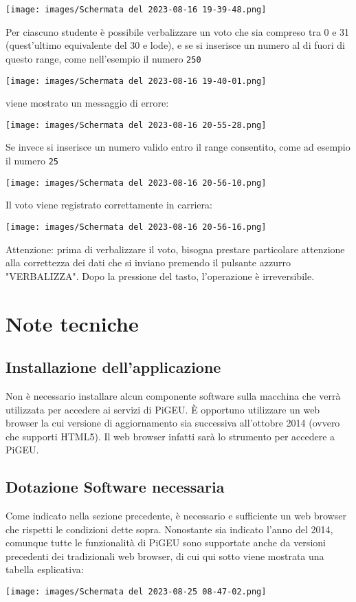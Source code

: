 \documentclass{article}
\begin{document}
    \texttt{[image: images/Schermata del 2023-08-16 19-39-48.png]}

    Per ciascuno studente è possibile verbalizzare un voto che sia compreso tra 0 e 31 (quest'ultimo equivalente del 30 e lode),
    e se si inserisce un numero al di fuori di questo range, come nell'esempio il numero \texttt{250}

    \texttt{[image: images/Schermata del 2023-08-16 19-40-01.png]}

    viene mostrato un messaggio di errore:

    \texttt{[image: images/Schermata del 2023-08-16 20-55-28.png]}

    Se invece si inserisce un numero valido entro il range consentito, come ad esempio il numero \texttt{25}

    \texttt{[image: images/Schermata del 2023-08-16 20-56-10.png]}

    Il voto viene registrato correttamente in carriera:

    \texttt{[image: images/Schermata del 2023-08-16 20-56-16.png]}

    Attenzione: prima di verbalizzare il voto, bisogna prestare particolare attenzione alla correttezza dei dati che si inviano premendo il pulsante azzurro "VERBALIZZA". Dopo la pressione del tasto, l'operazione è irreversibile.

    \section{Note tecniche}
    \subsection{Installazione dell'applicazione}
    Non è necessario installare alcun componente software sulla macchina che verrà utilizzata per accedere ai servizi di PiGEU. È opportuno utilizzare un web browser la cui versione di aggiornamento sia successiva all'ottobre 2014 (ovvero che supporti HTML5). Il web browser infatti sarà lo strumento per accedere a PiGEU.
    \subsection{Dotazione Software necessaria}
    Come indicato nella sezione precedente, è necessario e sufficiente un web browser che rispetti le condizioni dette sopra. Nonostante sia indicato l'anno del 2014, comunque tutte le funzionalità di PiGEU sono supportate anche da versioni precedenti dei tradizionali web browser, di cui qui sotto viene mostrata una tabella esplicativa:

    \texttt{[image: images/Schermata del 2023-08-25 08-47-02.png]}
\end{document}
